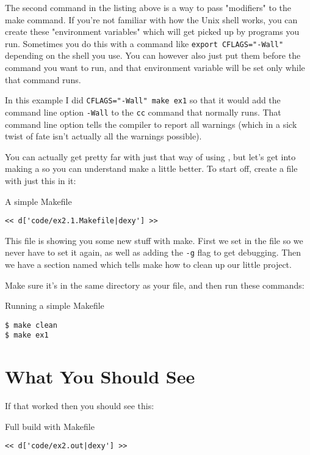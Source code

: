 The second command in the listing above is a way to pass "modifiers" to the
make command.  If you're not familiar with how the Unix shell works, you can
create these "environment variables" which will get picked up by programs you
run.  Sometimes you do this with a command like \verb|export CFLAGS="-Wall"|
depending on the shell you use.  You can however also just put them before the
command you want to run, and that environment variable will be set only while
that command runs.

In this example I did \verb|CFLAGS="-Wall" make ex1| so that it would
add the command line option \verb|-Wall| to the \verb|cc| command that
 normally runs.  That command line option tells the compiler
 to report all warnings (which in a sick twist of fate isn't
actually all the warnings possible).

You can actually get pretty far with just that way of using ,
but let's get into making a  so you can understand
make a little better.  To start off, create a file with just this
in it:

\begin{code}{A simple Makefile}
\begin{lstlisting}
<< d['code/ex2.1.Makefile|dexy'] >>
\end{lstlisting}
\end{code}

This file is showing you some new stuff with make.  First we set
 in the file so we never have to set it again, as well
as adding the \verb|-g| flag to get debugging.  Then we have a 
section named  which tells make how to clean up our
little project.

Make sure it's in the same directory as your  file, and then
run these commands:

\begin{Terminal}{Running a simple Makefile}
\begin{lstlisting}
$ make clean
$ make ex1
\end{lstlisting}
\end{Terminal}

\section{What You Should See}

If that worked then you should see this:

\begin{Terminal}{Full build with Makefile}
\begin{lstlisting}
<< d['code/ex2.out|dexy'] >>
\end{lstlisting}
\end{Terminal}

